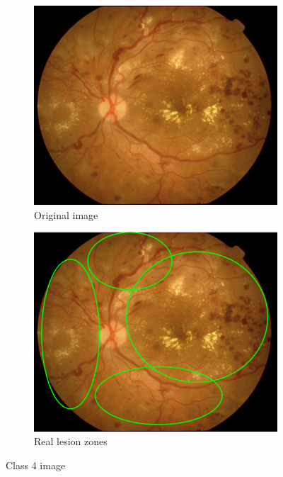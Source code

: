 \documentclass[review]{elsarticle}
\theoremstyle{definition} %
\theoremstyle{remark}
\begin{document}
\begin{figure}[h!]
	\centering
	\begin{subfigure}[b]{0.28\textwidth}
		\centering
		\includegraphics[width=\textwidth]{./figures/ica_retine_maps/G3-P4/g3.png}
		\caption{Original image}	
	\end{subfigure}
	\begin{subfigure}[b]{0.28\textwidth}
		\centering
		\includegraphics[width=\textwidth]{./figures/ica_retine_maps/G3-P4/metge.png}
		\caption{Real lesion zones}	
	\end{subfigure}
	\hfill 
	\caption{Class 4 image}  
	\label{fig:ica_components_class4_from} 
\end{figure}
\end{document}
